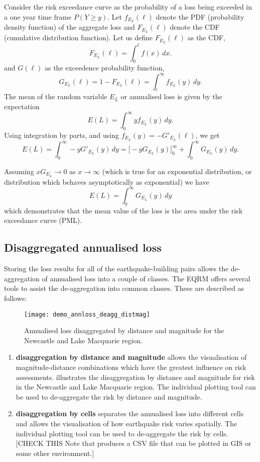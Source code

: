 Consider the risk exceedance curve as the probability of a loss
being exceeded in a one year time frame $P(Y \ge y)$. Let
$f_{E_L}(\ell)$ denote the PDF (probability density function) of
the aggregate loss and $F_{E_L}(\ell)$ denote the CDF (cumulative
distribution function). Let us define $F_{E_L}(\ell)$ as the CDF,
$$
 F_{E_L}(\ell) = \int_0^\ell f(x)\, dx.
$$
and $G(\ell)$ as the exceedence probability function,
$$
 G_{E_L}(\ell) = 1 - F_{E_L}(\ell) = \int_\ell^\infty f_{E_L}(y)\,dy.
$$
The mean of the random variable $E_L$ or annualised loss is given
by the expectation
$$
 E(L) = \int_0^\infty y f_{E_L}(y)\,dy.
$$
Using integration by parts, and using $f_{E_L}(y) =
-G'_{E_L}(\ell)$, we get
$$
 E(L) = \int_0^\infty -y G'_{E_L}(y)\,dy
      =  \big[ -yG_{E_L}(y)\big]_0^\infty + \int_0^\infty
      G_{E_L}(y)\,dy.
$$

Assuming $xG_{E_L}\to 0$ as $x\to\infty$ (which is true for an
exponential distribution, or distribution which behaves
asymptotically as exponential) we have
$$
 E(L) = \int_0^\infty G_{E_L}(y)\,dy
$$
which demonstrates that the mean value of the loss is the area
under the risk exceedance curve (PML).


\subsection{Disaggregated annualised loss}

Storing the loss results for all of the earthquake-building pairs
allows the de-aggregation of annualised loss into a couple of
classes. The EQRM offers several tools to assist the
de-aggregation into common classes. These
are described as follows:
\begin{figure}
\texttt{[image: demo\_annloss\_deagg\_distmag]}
 \caption{Annualised loss
disaggregated by distance and magnitude for the Newcastle and Lake
Macquarie region.} \label{fig-risk-deaggdistmag}
\end{figure}

\begin{enumerate}
\item \textbf{disaggregation by distance and magnitude} allows the
visualisation of magnitude-distance combinations which have the
greatest influence on risk assessments.
 illustrates the disaggregation by
distance and magnitude for risk in the Newcastle and Lake
Macquarie region. The individual plotting tool
 can be used
to de-aggregate the risk by
distance and magnitude. 

\item \textbf{disaggregation by cells} separates
the annualised loss into different cells and allows the
visualisation of how earthquake risk varies spatially. The
individual plotting tool
 can be used 
 to de-aggregate the risk by
cells. [CHECK THIS Note that 
produces a CSV file that can be plotted in GIS or some other
environment.]
\end{enumerate}

